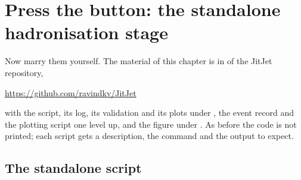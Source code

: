 \section{Press the button: the standalone hadronisation stage}
\label{sec:children_getting_married:standalone_code}

Now marry them yourself. The material of this chapter is in
 of the JitJet repository,
\begin{center}
  \url{https://github.com/ravindkv/JitJet}
\end{center}
with the script, its log, its validation and its plots under
, the event record and the plotting script one
level up, and the \CMSSW figure under . As before
the code is not printed; each script gets a description, the command and
the output to expect.

\subsection{The standalone script}

